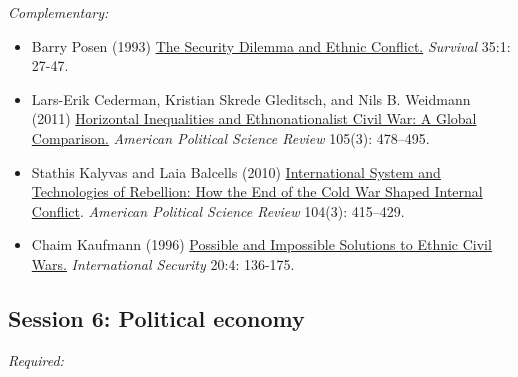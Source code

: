 \documentclass[12pt, a4paper]{article}
\begin{document}
\noindent\textit{Complementary:}

\begin{itemize}
  \item Barry Posen (1993) \href{https://doi.org/10.1080/00396339308442672}{The Security Dilemma and Ethnic Conflict.} \textit{Survival} 35:1: 27-47.
  \item Lars-Erik Cederman, Kristian Skrede Gleditsch, and Nils B. Weidmann (2011) \href{https://doi.org/10.1017/S0003055411000207}{Horizontal Inequalities and Ethnonationalist Civil War: A Global Comparison.} \textit{American Political Science Review} 105(3): 478--495.
  \item Stathis Kalyvas and Laia Balcells (2010) \href{https://doi.org/10.1017/S0003055410000286}{International System and Technologies of Rebellion: How the End of the Cold War Shaped Internal Conflict}. \textit{American Political Science Review} 104(3): 415--429.
	\item Chaim Kaufmann (1996) \href{https://doi.org/10.1162/isec.20.4.136}{Possible and Impossible Solutions to Ethnic Civil Wars.} \textit{International Security} 20:4: 136-175.
\end{itemize}


\subsection*{Session 6: Political economy}

\noindent\textit{Required:}
\end{document}
